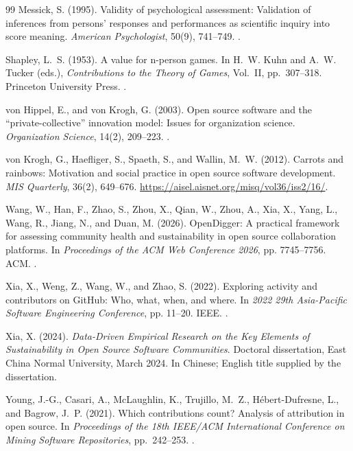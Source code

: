 \begin{thebibliography}{99}
Messick, S. (1995).
Validity of psychological assessment: Validation of inferences from persons' responses and performances as scientific inquiry into score meaning.
\emph{American Psychologist}, 50(9), 741--749.
.

Shapley, L.~S. (1953).
A value for n-person games.
In H.~W. Kuhn and A.~W. Tucker (eds.), \emph{Contributions to the Theory of Games}, Vol.~II, pp.~307--318. Princeton University Press.
.

von Hippel, E., and von Krogh, G. (2003).
Open source software and the “private-collective” innovation model: Issues for organization science.
\emph{Organization Science}, 14(2), 209--223.
.

von Krogh, G., Haefliger, S., Spaeth, S., and Wallin, M.~W. (2012).
Carrots and rainbows: Motivation and social practice in open source software development.
\emph{MIS Quarterly}, 36(2), 649--676.
\url{https://aisel.aisnet.org/misq/vol36/iss2/16/}.

Wang, W., Han, F., Zhao, S., Zhou, X., Qian, W., Zhou, A., Xia, X., Yang, L., Wang, R., Jiang, N., and Duan, M. (2026).
OpenDigger: A practical framework for assessing community health and sustainability in open source collaboration platforms.
In \emph{Proceedings of the ACM Web Conference 2026}, pp. 7745--7756. ACM.
.

Xia, X., Weng, Z., Wang, W., and Zhao, S. (2022).
Exploring activity and contributors on GitHub: Who, what, when, and where.
In \emph{2022 29th Asia-Pacific Software Engineering Conference}, pp. 11--20. IEEE.
.

Xia, X. (2024).
\emph{Data-Driven Empirical Research on the Key Elements of Sustainability in Open Source Software Communities}.
Doctoral dissertation, East China Normal University, March 2024. In Chinese; English title supplied by the dissertation.

Young, J.-G., Casari, A., McLaughlin, K., Trujillo, M.~Z., Hébert-Dufresne, L., and Bagrow, J.~P. (2021).
Which contributions count? Analysis of attribution in open source.
In \emph{Proceedings of the 18th IEEE/ACM International Conference on Mining Software Repositories}, pp.~242--253.
.


\end{thebibliography}
